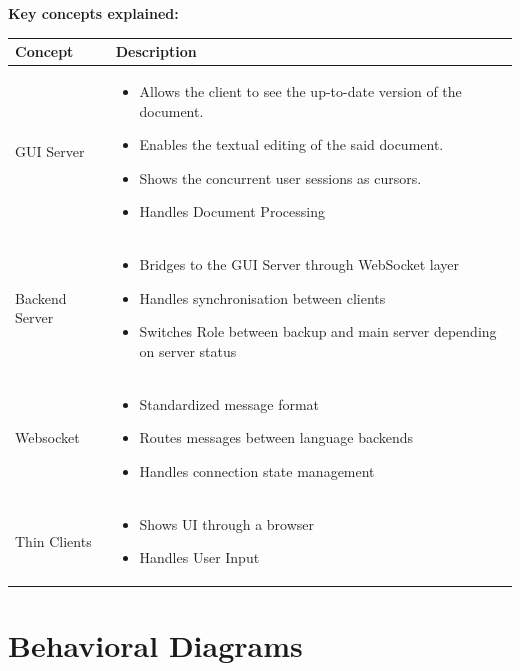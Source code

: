 \documentclass[12pt,a4paper]{article}
\renewcommand\_{\textunderscore\allowbreak}
\begin{document}
\textbf{Key concepts explained:}
\begin{tabularx}{\textwidth}{|l|X|}
    \hline
    \textbf{Concept} & \textbf{Description} \\
    \hline
    GUI Server & 
    \begin{itemize}[nosep, left=0pt]
        \item Allows the client to see the up-to-date version of the document.
        \item Enables the textual editing of the said document.
        \item Shows the concurrent user sessions as cursors.
        \item Handles Document Processing
    \end{itemize} \\
    \hline
    Backend Server & 
    \begin{itemize}[nosep, left=0pt]
        \item Bridges to the GUI Server through WebSocket layer
        \item Handles synchronisation between clients
        \item Switches Role between backup and main server depending on server status
    \end{itemize} \\
    \hline
    Websocket & 
    \begin{itemize}[nosep, left=0pt]
        \item Standardized message format
        \item Routes messages between language backends
        \item Handles connection state management
    \end{itemize} \\
    \hline
    Thin Clients & 
    \begin{itemize}[nosep, left=0pt]
        \item Shows UI through a browser
        \item Handles User Input
    \end{itemize} \\
    \hline
\end{tabularx}


\section{Behavioral Diagrams}
\end{document}
